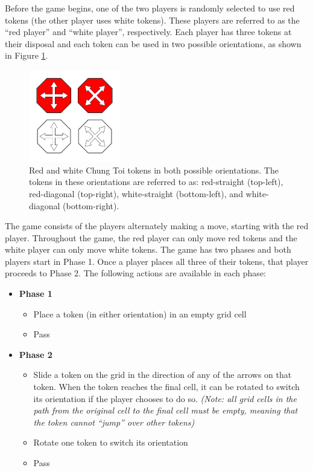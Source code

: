 \documentclass[11pt,a4paper]{report}
\begin{document}
Before the game begins, one of the two players is randomly selected to use red tokens (the other player uses white tokens). These players are referred to as the ``red player'' and ``white player'', respectively. Each player has three tokens at their disposal and each token can be used in two possible orientations, as shown in Figure \ref{chung-toi-tokens}.

\begin{figure}[htbp]
	\begin{center}
		\includegraphics[width=40mm]{chung_toi_tokens.png}
		\caption[Chung Toi tokens]{Red and white Chung Toi tokens in both possible orientations. The tokens in these orientations are referred to as: red-straight (top-left), red-diagonal (top-right), white-straight (bottom-left), and white-diagonal (bottom-right).}
		\label{chung-toi-tokens}
	\end{center}
\end{figure}

The game consists of the players alternately making a move, starting with the red player. Throughout the game, the red player can only move red tokens and the white player can only move white tokens. The game has two phases and both players start in Phase 1. Once a player places all three of their tokens, that player proceeds to Phase 2. The following actions are available in each phase:

\begin{itemize}

	\item \textbf{Phase 1}
		\begin{itemize}
			\item Place a token (in either orientation) in an empty grid cell
			\item Pass
		\end{itemize}

	\item \textbf{Phase 2}
		\begin{itemize}
			\item Slide a token on the grid in the direction of any of the arrows on that token. When the token reaches the final cell, it can be rotated to switch its orientation if the player chooses to do so. \emph{(Note: all grid cells in the path from the original cell to the final cell must be empty, meaning that the token cannot ``jump'' over other tokens)}
			\item Rotate one token to switch its orientation
			\item Pass
		\end{itemize}

\end{itemize}
\end{document}
